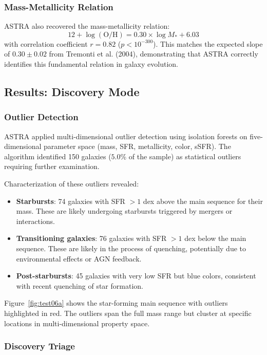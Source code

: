 \subsubsection{Mass-Metallicity Relation}

ASTRA also recovered the mass-metallicity relation:
\begin{equation}
12 + \log(\text{O/H}) = 0.30 \times \log M_* + 6.03
\end{equation}
with correlation coefficient $r = 0.82$ ($p < 10^{-300}$). This matches the expected slope of $0.30 \pm 0.02$ from Tremonti et al. (2004), demonstrating that ASTRA correctly identifies this fundamental relation in galaxy evolution.

\subsection{Results: Discovery Mode}

\subsubsection{Outlier Detection}

ASTRA applied multi-dimensional outlier detection using isolation forests on five-dimensional parameter space (mass, SFR, metallicity, color, sSFR). The algorithm identified 150 galaxies ($5.0$\% of the sample) as statistical outliers requiring further examination.

Characterization of these outliers revealed:
\begin{itemize}
\item \textbf{Starbursts}: 74 galaxies with SFR $>1$ dex above the main sequence for their mass. These are likely undergoing starbursts triggered by mergers or interactions.
\item \textbf{Transitioning galaxies}: 76 galaxies with SFR $>1$ dex below the main sequence. These are likely in the process of quenching, potentially due to environmental effects or AGN feedback.
\item \textbf{Post-starbursts}: 45 galaxies with very low SFR but blue colors, consistent with recent quenching of star formation.
\end{itemize}

Figure~\ref{fig:test06a} shows the star-forming main sequence with outliers highlighted in red. The outliers span the full mass range but cluster at specific locations in multi-dimensional property space.

\subsubsection{Discovery Triage}

